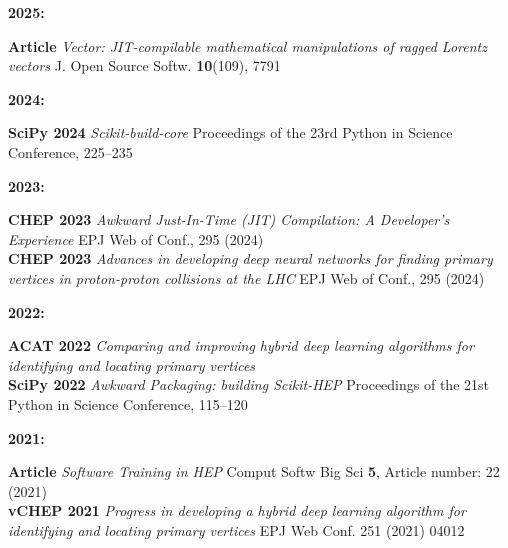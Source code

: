 \documentclass[10pt,letterpaper]{moderncv}
\begin{document}

\begin{minipage}[t]{.06\textwidth}
\textbf{2025:}
\end{minipage}%
\begin{minipage}[t]{.94\textwidth}
\textbf{Article} \emph{Vector: JIT-compilable mathematical manipulations of ragged Lorentz vectors} J. Open Source Softw. \textbf{10}(109), 7791
\end{minipage}

\begin{minipage}[t]{.06\textwidth}
\textbf{2024:}
\end{minipage}%
\begin{minipage}[t]{.94\textwidth}
\textbf{SciPy 2024} \emph{Scikit-build-core} Proceedings of the 23rd Python in Science Conference, 225--235
\end{minipage}

\begin{minipage}[t]{.06\textwidth}
\textbf{2023:}
\end{minipage}%
\begin{minipage}[t]{.94\textwidth}
\textbf{CHEP 2023} \emph{Awkward Just-In-Time (JIT) Compilation: A Developer's Experience} EPJ Web of Conf., 295 (2024) \\
\textbf{CHEP 2023} \emph{Advances in developing deep neural networks for finding primary vertices in proton-proton collisions at the LHC} EPJ Web of Conf., 295 (2024)
\end{minipage}


\begin{minipage}[t]{.06\textwidth}
\textbf{2022:}
\end{minipage}%
\begin{minipage}[t]{.94\textwidth}
\textbf{ACAT 2022} \emph{Comparing and improving hybrid deep learning algorithms for identifying and locating primary vertices} \\
\textbf{SciPy 2022} \emph{Awkward Packaging: building Scikit-HEP} Proceedings of the 21st Python in Science Conference, 115--120
\end{minipage}

\begin{minipage}[t]{.06\textwidth}
\textbf{2021:}
\end{minipage}%
\begin{minipage}[t]{.94\textwidth}
\textbf{Article} \emph{Software Training in HEP} Comput Softw Big Sci \textbf{5}, Article number: 22 (2021) \\
\textbf{vCHEP 2021} \emph{Progress in developing a hybrid deep learning algorithm for identifying and locating primary vertices} EPJ Web Conf. 251 (2021) 04012
\end{minipage}
\end{document}
